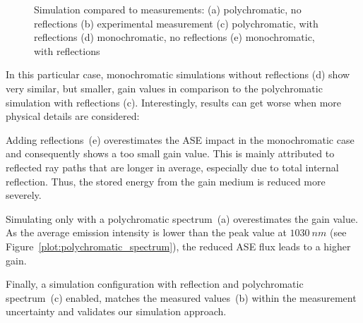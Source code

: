 \begin{figure}[H]
  \centerline{
    }
  \caption{Simulation compared to measurements:
    (a) polychromatic, no reflections
    (b) experimental measurement
    (c) polychromatic, with reflections
    (d) monochromatic, no reflections
    (e) monochromatic, with reflections}
\label{plot:benchmark}
\end{figure}

In this particular case, monochromatic simulations without reflections
(d) show very similar, but smaller, gain values in comparison to the
polychromatic simulation with reflections (c).  Interestingly, results
can get worse when more physical details are considered:

Adding reflections~(e) overestimates the ASE impact in the
monochromatic case and consequently shows a too small gain value.
This is mainly attributed to reflected ray paths that are longer in
average, especially due to total internal reflection.
Thus, the stored energy from the gain medium is reduced more severely.

Simulating only with a polychromatic spectrum~(a) overestimates the
gain value. As the average emission intensity is lower than the peak
value at $1030~nm$ (see Figure~\ref{plot:polychromatic_spectrum}), the
reduced ASE flux leads to a higher gain.

Finally, a simulation configuration with reflection and
polychromatic spectrum~(c) enabled, matches the measured values~(b)
within the measurement uncertainty and validates our simulation
approach.

